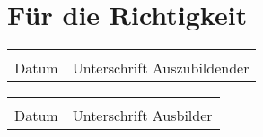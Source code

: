 \documentclass[11pt,a4paper,DIV=calc]{scrartcl}
\begin{document}
\setlength{\parindent}{0cm}
\section*{Für die Richtigkeit}
\vspace{.5cm}
\begin{multicols}{2}
\begin{tabular}{@{}p{2cm}p{5cm}@{}}
	\hrulefill & \hrulefill\\
	Datum & Unterschrift Auszubildender
\end{tabular}
\columnbreak
\begin{tabular}{@{}p{2cm}p{5cm}@{}}
	\hrulefill & \hrulefill\\
	Datum & Unterschrift Ausbilder
\end{tabular}
\end{multicols}
	
\end{document}
